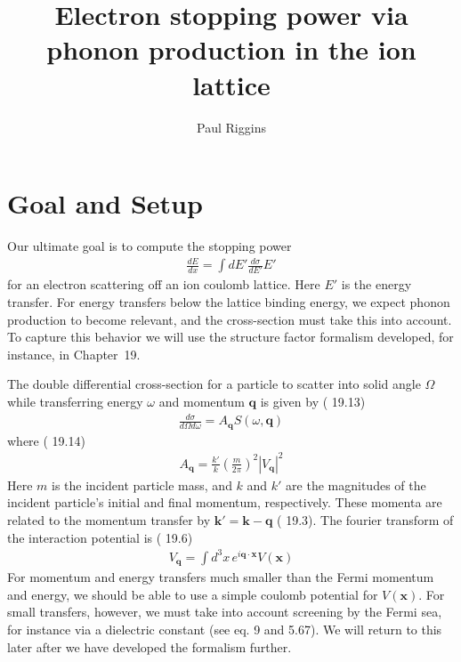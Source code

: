 \documentclass{article}
\title{Electron stopping power via phonon production in the ion lattice}
\author{Paul Riggins}
\begin{document}
\maketitle{}



\section{Goal and Setup}

Our ultimate goal is to compute the stopping power
\begin{align}
\frac{d E}{d x} = \int dE' \frac{d \sigma}{dE'}E'
\end{align}
for an electron scattering off an ion coulomb lattice. Here $E'$ is the energy transfer. For energy transfers below the lattice binding energy, we expect phonon production to become relevant, and the cross-section must take this into account. To capture this behavior we will use the structure factor formalism developed, for instance, in \cite{quantum} Chapter~19.

The double differential cross-section for a particle to scatter into solid angle $\Omega$ while transferring energy $\omega$ and momentum $\textbf{q}$ is given by (\cite{quantum} 19.13)
\begin{align}
\frac{d \sigma}{d \Omega d \omega} = A_\textbf{q} S(\omega, \textbf{q})
\label{eq:DoubleDifferential}
\end{align}
where (\cite{quantum} 19.14)
\begin{align}
A_\textbf{q} = \frac{k'}{k} \left( \frac{m}{2 \pi} \right)^2 |V_\textbf{q}|^2
\end{align}
Here $m$ is the incident particle mass, and $k$ and $k'$ are the magnitudes of the incident particle's initial and final momentum, respectively. These momenta are related to the momentum transfer by $\textbf{k}' = \textbf{k} - \textbf{q}$ (\cite{quantum} 19.3). The fourier transform of the interaction potential is (\cite{quantum} 19.6)
\begin{align}
V_\textbf{q} = \int d^3 x\, e^{i\textbf{q}\cdot \textbf{x}} V(\textbf{x})
\end{align}
For momentum and energy transfers much smaller than the Fermi momentum and energy, we should be able to use a simple coulomb potential for $V(\textbf{x})$. For small transfers, however, we must take into account screening by the Fermi sea, for instance via a dielectric constant (see \cite{dwarf} eq. 9 and \cite{french} 5.67). We will return to this later after we have developed the formalism further.
\end{document}
